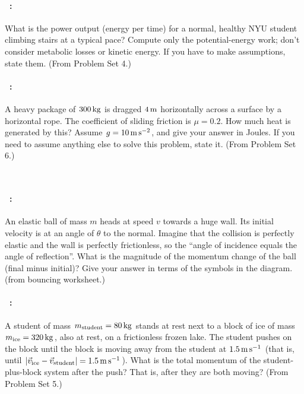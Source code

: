 \documentclass[12pt]{article} 
\begin{document}
\vfill

\paragraph{\problemname~\theproblem:}%
What is the power output (energy per time) for a normal, healthy NYU
student climbing stairs at a typical pace? Compute only the
potential-energy work; don't consider metabolic losses or kinetic
energy. If you have to make assumptions, state them.
(From Problem Set 4.)

\vfill

\paragraph{\problemname~\theproblem:}%
A heavy package of $300\,\mathrm{kg}$ is
dragged $4\,\mathrm{m}$ horizontally across a surface by a horizontal
rope. The coefficient of sliding friction is $\mu = 0.2$. How much
heat is generated by this?  Assume $g = 10\,\mathrm{m}\,\mathrm{s}^{-2}$, and give your
answer in Joules. If you need to assume anything else to solve this
problem, state it.
(From Problem Set 6.)

\vfill
~
\clearpage

\paragraph{\problemname~\theproblem:}%
An elastic ball of mass $m$ heads at speed $v$ towards a huge wall.
Its initial velocity is at an angle of $\theta$ to the normal.
Imagine that the collision is perfectly elastic and the
wall is perfectly frictionless, so the ``angle of incidence equals the
angle of reflection''. What is the magnitude of the momentum change of the ball (final
minus initial)?
Give your answer in terms of the symbols in the diagram.
(from bouncing worksheet.)

\vfill

\paragraph{\problemname~\theproblem:}%
A student of mass $m_\mathrm{student}=80\,\mathrm{kg}$ stands at rest next to
a block of ice of mass $m_\mathrm{ice}=320\,\mathrm{kg}$, also at rest, on a
frictionless frozen lake.  The student pushes on the block until the
block is moving away from the student at $1.5\,\mathrm{m}\,\mathrm{s}^{-1}$ (that is, until
$\left|\vec{v}_\mathrm{ice}-\vec{v}_\mathrm{student}\right|=1.5\,\mathrm{m}\,\mathrm{s}^{-1}$).
What is the total momentum of the student-plus-block system after the
push? That is, after they are both moving?
(From Problem Set 5.)
\end{document}
